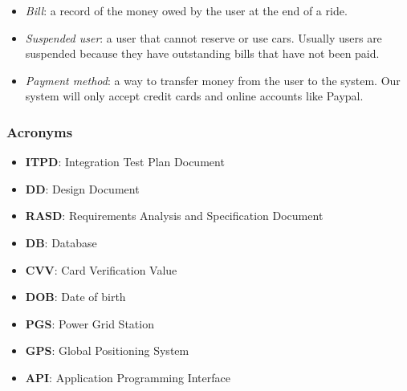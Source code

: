 \documentclass[english]{article}
\begin{document}
\begin{itemize}
\item{\textit{Bill}: a record of the money owed by the user at the end of a ride.}
\item{\textit{Suspended user}: a user that cannot reserve or use cars. Usually users are suspended because they have outstanding bills that have not been paid.}
\item{\textit{Payment method}: a way to transfer money from the user to the system. Our system will only accept credit cards and online accounts like Paypal.}
\end{itemize}

\subsubsection{Acronyms}
\begin{itemize}
\item{\textbf{ITPD}: Integration Test Plan Document}
\item{\textbf{DD}: Design Document}
\item{\textbf{RASD}: Requirements Analysis and Specification Document}
\item{\textbf{DB}: Database}
\item{\textbf{CVV}: Card Verification Value}
\item{\textbf{DOB}: Date of birth}
\item{\textbf{PGS}: Power Grid Station}
\item{\textbf{GPS}: Global Positioning System}
\item{\textbf{API}: Application Programming Interface}
\end{itemize}

\end{document}
